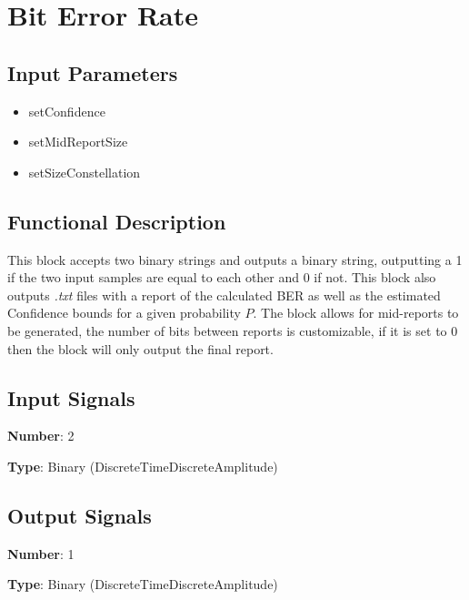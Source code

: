 \clearpage

\section{Bit Error Rate}

\subsection*{Input Parameters}

\begin{multicols}{2}
	\begin{itemize}
		\item setConfidence
		\item setMidReportSize
		\item setSizeConstellation
	\end{itemize}
\end{multicols}

\subsection*{Functional Description}

This block accepts two binary strings and outputs a binary string, outputting a 1 if the two input samples are equal to each other and 0 if not. This block also outputs \textit{.txt} files with a report of the calculated BER as well as the estimated Confidence bounds for a given probability $P$. The block allows for mid-reports to be generated, the number of bits between reports is customizable, if it is set to 0 then the block will only output the final report.

\subsection*{Input Signals}

\textbf{Number}: 2

\textbf{Type}: Binary (DiscreteTimeDiscreteAmplitude)

\subsection*{Output Signals}

\textbf{Number}: 1

\textbf{Type}: Binary (DiscreteTimeDiscreteAmplitude)
